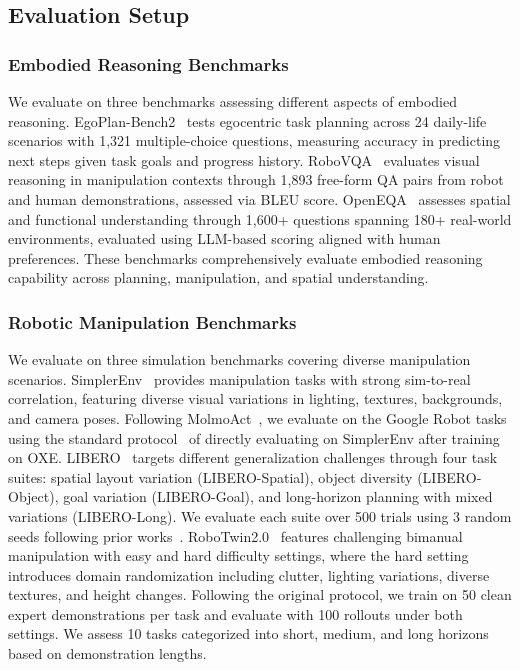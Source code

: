\subsection{Evaluation Setup}

\subsubsection{Embodied Reasoning Benchmarks}

We evaluate on three benchmarks assessing different aspects of embodied reasoning. EgoPlan-Bench2~\cite{chen2023egoplan} tests egocentric task planning across 24 daily-life scenarios with 1,321 multiple-choice questions, measuring accuracy in predicting next steps given task goals and progress history. RoboVQA~\cite{sermanet2024robovqa} evaluates visual reasoning in manipulation contexts through 1,893 free-form QA pairs from robot and human demonstrations, assessed via BLEU score. OpenEQA~\cite{majumdar2024openeqa} assesses spatial and functional understanding through 1,600+ questions spanning 180+ real-world environments, evaluated using LLM-based scoring aligned with human preferences. These benchmarks comprehensively evaluate embodied reasoning capability across planning, manipulation, and spatial understanding.

\subsubsection{Robotic Manipulation Benchmarks}






We evaluate on three simulation benchmarks covering diverse manipulation scenarios. SimplerEnv~\cite{li24simpler} provides manipulation tasks with strong sim-to-real correlation, featuring diverse visual variations in lighting, textures, backgrounds, and camera poses. Following MolmoAct~\cite{lee2025molmoact}, we evaluate on the Google Robot tasks using the standard protocol~\cite{kim24openvla, lee2025molmoact} of directly evaluating on SimplerEnv after training on OXE. LIBERO~\cite{liu2023libero} targets different generalization challenges through four task suites: spatial layout variation (LIBERO-Spatial), object diversity (LIBERO-Object), goal variation (LIBERO-Goal), and long-horizon planning with mixed variations (LIBERO-Long). We evaluate each suite over 500 trials using 3 random seeds following prior works~\cite{kim24openvla, lee2025molmoact}. RoboTwin2.0~\cite{chen2025robotwin2} features challenging bimanual manipulation with easy and hard difficulty settings, where the hard setting introduces domain randomization including clutter, lighting variations, diverse textures, and height changes. Following the original protocol, we train on 50 clean expert demonstrations per task and evaluate with 100 rollouts under both settings. We assess 10 tasks categorized into short, medium, and long horizons based on demonstration lengths.


